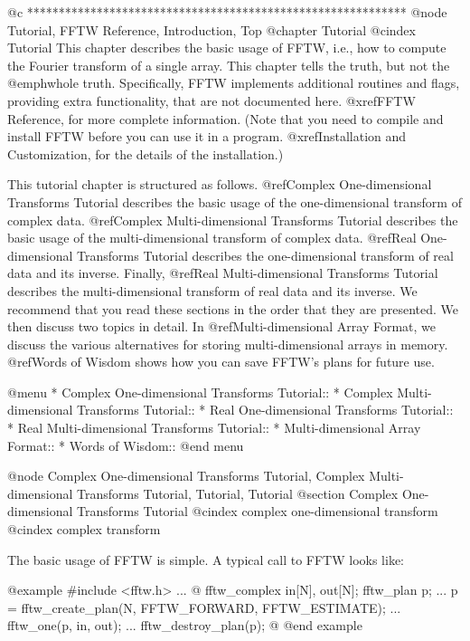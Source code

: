 @c ************************************************************
@node  Tutorial, FFTW Reference, Introduction, Top
@chapter Tutorial
@cindex Tutorial
This chapter describes the basic usage of FFTW, i.e., how to compute the
Fourier transform of a single array.  This chapter tells the truth, but
not the @emph{whole} truth. Specifically, FFTW implements additional
routines and flags, providing extra functionality, that are not
documented here.  @xref{FFTW Reference}, for more complete information.
(Note that you need to compile and install FFTW before you can use it in
a program.  @xref{Installation and Customization}, for the details of
the installation.)

This tutorial chapter is structured as follows.  @ref{Complex
One-dimensional Transforms Tutorial} describes the basic usage of the
one-dimensional transform of complex data.  @ref{Complex
Multi-dimensional Transforms Tutorial} describes the basic usage of the
multi-dimensional transform of complex data.  @ref{Real One-dimensional
Transforms Tutorial} describes the one-dimensional transform of real
data and its inverse.  Finally, @ref{Real Multi-dimensional Transforms
Tutorial} describes the multi-dimensional transform of real data and its
inverse.  We recommend that you read these sections in the order that
they are presented.  We then discuss two topics in detail.  In
@ref{Multi-dimensional Array Format}, we discuss the various
alternatives for storing multi-dimensional arrays in memory.  @ref{Words
of Wisdom} shows how you can save FFTW's plans for future use.

@menu
* Complex One-dimensional Transforms Tutorial::  
* Complex Multi-dimensional Transforms Tutorial::  
* Real One-dimensional Transforms Tutorial::  
* Real Multi-dimensional Transforms Tutorial::  
* Multi-dimensional Array Format::  
* Words of Wisdom::             
@end menu

@node  Complex One-dimensional Transforms Tutorial, Complex Multi-dimensional Transforms Tutorial, Tutorial, Tutorial
@section Complex One-dimensional Transforms Tutorial
@cindex complex one-dimensional transform
@cindex complex transform

The basic usage of FFTW is simple.  A typical call to FFTW looks like:

@example
#include <fftw.h>
...
@{
     fftw_complex in[N], out[N];
     fftw_plan p;
     ...
     p = fftw_create_plan(N, FFTW_FORWARD, FFTW_ESTIMATE);
     ...
     fftw_one(p, in, out);
     ...
     fftw_destroy_plan(p);  
@}
@end example

